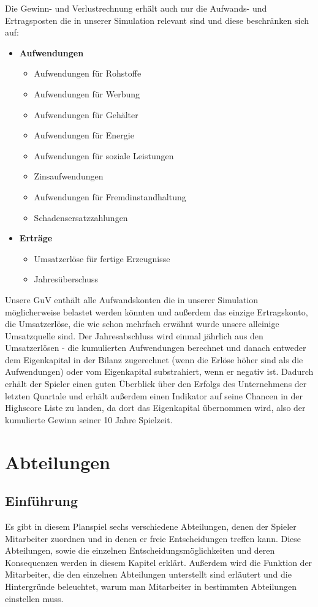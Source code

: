 Die Gewinn- und Verlustrechnung erhält auch nur die Aufwands- und Ertragsposten die in unserer Simulation relevant sind und diese beschränken sich auf:
\begin{itemize}
	\item \textbf{Aufwendungen}	
	\begin{itemize}
		\item Aufwendungen für Rohstoffe
		\item Aufwendungen für Werbung
		\item Aufwendungen für Gehälter
		\item Aufwendungen für Energie
		\item Aufwendungen für soziale Leistungen
		\item Zinsaufwendungen
		\item Aufwendungen für Fremdinstandhaltung
		\item Schadensersatzzahlungen
		
	\end{itemize}
	\item \textbf{Erträge}
	\begin{itemize}
		\item Umsatzerlöse für fertige Erzeugnisse
		\item Jahresüberschuss
	\end{itemize}
\end{itemize}

Unsere GuV enthält alle Aufwandskonten die in unserer Simulation möglicherweise belastet werden könnten und außerdem das einzige Ertragskonto, die Umsatzerlöse, die wie schon mehrfach erwähnt wurde unsere alleinige Umsatzquelle sind. Der Jahresabschluss wird einmal jährlich aus den Umsatzerlösen - die kumulierten Aufwendungen berechnet und danach entweder dem Eigenkapital in der Bilanz zugerechnet (wenn die Erlöse höher sind als die Aufwendungen) oder vom Eigenkapital substrahiert, wenn er negativ ist. Dadurch erhält der Spieler einen guten Überblick über den Erfolgs des Unternehmens der letzten Quartale und erhält außerdem einen Indikator auf seine Chancen in der Highscore Liste zu landen, da dort das Eigenkapital übernommen wird, also der kumulierte Gewinn seiner 10 Jahre Spielzeit. 

\section{Abteilungen}
\subsection{Einführung}
Es gibt in diesem Planspiel sechs verschiedene Abteilungen, denen der Spieler Mitarbeiter zuordnen und in denen er freie Entscheidungen treffen kann. Diese Abteilungen, sowie die einzelnen Entscheidungsmöglichkeiten und deren Konsequenzen werden in diesem Kapitel erklärt. Außerdem wird die Funktion der Mitarbeiter, die den einzelnen Abteilungen unterstellt sind erläutert und die Hintergründe beleuchtet, warum man Mitarbeiter in bestimmten Abteilungen einstellen muss.
